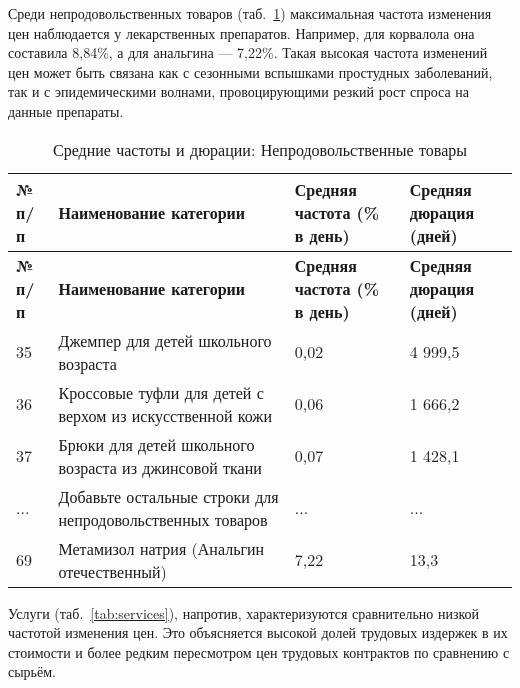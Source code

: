 Среди непродовольственных товаров (таб.~\ref{tab:non_food_products}) максимальная частота изменения цен наблюдается у лекарственных препаратов. Например, для корвалола она составила 8,84\%, а для анальгина — 7,22\%. Такая высокая частота изменений цен может быть связана как с сезонными вспышками простудных заболеваний, так и с эпидемическими волнами, провоцирующими резкий рост спроса на данные препараты.

\begin{longtable}{|p{1cm}|p{8.5cm}|p{3.5cm}|p{3cm}|} %
	\caption{Средние частоты и дюрации: Непродовольственные товары}
	\label{tab:non_food_products} \\
	\hline
	\textbf{№ п/п} & \textbf{Наименование категории} & \textbf{Средняя частота (\% в день)} & \textbf{Средняя дюрация (дней)} \\
	\hline
	\hline
	\endfirsthead
	
	\hline
	\textbf{№ п/п} & \textbf{Наименование категории} & \textbf{Средняя частота (\% в день)} & \textbf{Средняя дюрация (дней)} \\
	\hline
	\hline
	\endhead
	
	\hline
	\endfoot
	
	\hline
	\endlastfoot
	
	35 & Джемпер для детей школьного возраста & 0,02 & 4 999,5 \\ \hline
	36 & Кроссовые туфли для детей с верхом из искусственной кожи & 0,06 & 1 666,2 \\ \hline
	37 & Брюки для детей школьного возраста из джинсовой ткани & 0,07 & 1 428,1 \\ \hline
	... & Добавьте остальные строки для непродовольственных товаров & ... & ... \\ \hline
	69 & Метамизол натрия (Анальгин отечественный) & 7,22 & 13,3 \\ \hline
	
\end{longtable}

Услуги (таб.~\ref{tab:services}), напротив, характеризуются сравнительно низкой частотой изменения цен. Это объясняется высокой долей трудовых издержек в их стоимости и более редким пересмотром цен трудовых контрактов по сравнению с сырьём.


